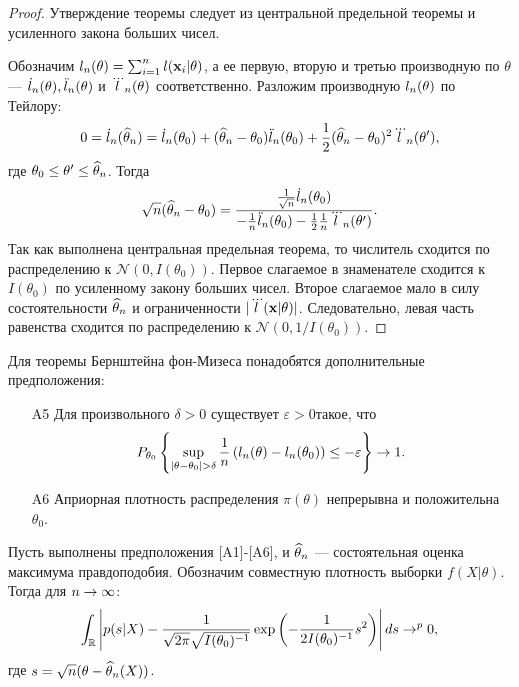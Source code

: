 \begin{proof}
Утверждение теоремы следует из центральной предельной теоремы и усиленного закона больших чисел. 

Обозначим $l_n(\theta) = \sum_{i = 1}^{n} l(\mathbf{x}_i | \theta)$,
а ее первую, вторую и третью производную по $\theta$ --- $\dot{l}_n(\theta), \ddot{l}_n(\theta)$ и $\dddot{l}_n(\theta)$ соответственно.
Разложим производную $l_n(\theta)$ по Тейлору:
\[
0 = \dot{l}_{n}(\widehat{\theta}_n) = \dot{l}_{n}(\theta_0) + (\widehat{\theta}_n - \theta_0) \ddot{l}_{n}(\theta_0) + \frac12 (\widehat{\theta}_n - \theta_0)^2 \dddot{l}_{n}(\theta'),
\]
где $\theta_0 \leq \theta' \leq \widehat{\theta}_n$.
Тогда
\[
\sqrt{n} (\widehat{\theta}_n - \theta_0) = \frac{\frac{1}{\sqrt{n}} \dot{l}_{n}(\theta_0)}{-\frac{1}{n} \ddot{l}_{n}(\theta_0) - \frac12 \frac{1}{n} \dddot{l}_{n}(\theta')}. 
\]
Так как выполнена центральная предельная теорема, то числитель сходится по распределению к $\mathcal{N}(0, I(\theta_0))$.
Первое слагаемое в знаменателе сходится к $I(\theta_0)$ по усиленному закону больших чисел.
Второе слагаемое мало в силу состоятельности $\widehat{\theta}_n$ и ограниченности $|\dddot{l}(\mathbf{x} | \theta)|$.
Следовательно, левая часть равенства сходится по распределению к 
$\mathcal{N}(0, 1 / I(\theta_0))$.
\end{proof}

Для теоремы Бернштейна фон-Мизеса понадобятся дополнительные предположения:
\begin{itemize}
	\item[A5] Для произвольного $\delta > 0$ существует $\varepsilon > 0$такое, что
	\[
	P_{\theta_0} \left\{ \sup_{|\theta - \theta_0| > \delta} \frac{1}{n} \left( l_n(\theta) - l_n(\theta_0) \right) \leq -\varepsilon \right\} \rightarrow 1.
	\]
	\item[A6] Априорная плотность распределения $\pi(\theta)$ непрерывна и положительна $\theta_0$.
\end{itemize}

\begin{Theorem}
Пусть выполнены предположения [A1]-[A6], и $\widehat{\theta}_n$ --- состоятельная оценка максимума правдоподобия.
Обозначим совместную плотность выборки $f(X| \theta)$.
Тогда для $n \rightarrow \infty$:
\[
\int_{\mathbb{R}} \left|p(s | X) - \frac{1}{\sqrt{2\pi}\sqrt{I(\theta_0)^{-1}}} \exp \left(-\frac{1}{2 I(\theta_0)^{-1}} s^2 \right) \right| ds \rightarrow^{p} 0,
\]
где $s = \sqrt{n} (\theta - \widehat{\theta}_n(X))$.
\end{Theorem}


